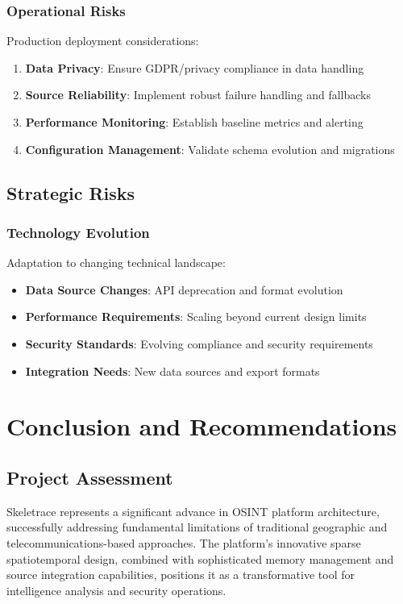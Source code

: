 \documentclass[12pt,a4paper]{article}
\begin{document}
\subsubsection{Operational Risks}
Production deployment considerations:

\begin{enumerate}
\item \textbf{Data Privacy}: Ensure GDPR/privacy compliance in data handling
\item \textbf{Source Reliability}: Implement robust failure handling and fallbacks
\item \textbf{Performance Monitoring}: Establish baseline metrics and alerting
\item \textbf{Configuration Management}: Validate schema evolution and migrations
\end{enumerate}

\subsection{Strategic Risks}

\subsubsection{Technology Evolution}
Adaptation to changing technical landscape:

\begin{itemize}
\item \textbf{Data Source Changes}: API deprecation and format evolution
\item \textbf{Performance Requirements}: Scaling beyond current design limits
\item \textbf{Security Standards}: Evolving compliance and security requirements
\item \textbf{Integration Needs}: New data sources and export formats
\end{itemize}

\section{Conclusion and Recommendations}

\subsection{Project Assessment}

Skeletrace represents a significant advance in OSINT platform architecture, successfully addressing fundamental limitations of traditional geographic and telecommunications-based approaches. The platform's innovative sparse spatiotemporal design, combined with sophisticated memory management and source integration capabilities, positions it as a transformative tool for intelligence analysis and security operations.
\end{document}

